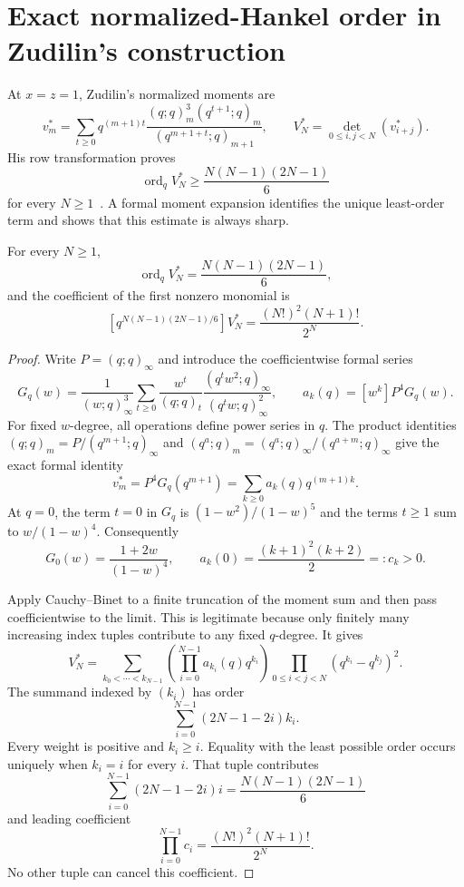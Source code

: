 \documentclass[11pt]{article}
\begin{document}
\section{Exact normalized-Hankel order in Zudilin's construction}
\label{sec:hankel-order}

At $x=z=1$, Zudilin's normalized moments are
\[
 v_m^*=\sum_{t\ge0}q^{(m+1)t}
 \frac{(q;q)_m^3(q^{t+1};q)_m}{(q^{m+1+t};q)_{m+1}},
 \qquad
 V_N^*=\det_{0\le i,j<N}(v_{i+j}^*).
\]
His row transformation proves
\[
 \operatorname{ord}_q V_N^*\ge
 \frac{N(N-1)(2N-1)}6
\]
for every $N\ge1$~\cite[Section~4]{zudilin2016}.  A formal moment expansion identifies the unique least-order term and
shows that this estimate is always sharp.

\begin{theorem}
\label{res:zudilin-sharp-qorder}
For every $N\ge1$,
\[
 \operatorname{ord}_q V_N^*=\frac{N(N-1)(2N-1)}6,
\]
and the coefficient of the first nonzero monomial is
\[
 [q^{N(N-1)(2N-1)/6}]V_N^*
   =\frac{(N!)^2(N+1)!}{2^N}.
\]
\end{theorem}

\begin{proof}
Write $P=(q;q)_\infty$ and introduce the coefficientwise formal series
\[
 G_q(w)=\frac1{(w;q)_\infty^3}
 \sum_{t\ge0}\frac{w^t}{(q;q)_t}
       \frac{(q^tw^2;q)_\infty}{(q^tw;q)_\infty^2},
 \qquad a_k(q)=[w^k]P^4G_q(w).
\]
For fixed $w$-degree, all operations define power series in $q$.
The product identities
$(q;q)_m=P/(q^{m+1};q)_\infty$ and
$(q^a;q)_m=(q^a;q)_\infty/(q^{a+m};q)_\infty$
give the exact formal identity
\[
 v_m^*=P^4G_q(q^{m+1})
      =\sum_{k\ge0}a_k(q)q^{(m+1)k}.
\]
At $q=0$, the term $t=0$ in $G_q$ is
$(1-w^2)/(1-w)^5$ and the terms $t\ge1$ sum to $w/(1-w)^4$.
Consequently
\[
 G_0(w)=\frac{1+2w}{(1-w)^4},\qquad
 a_k(0)=\frac{(k+1)^2(k+2)}2=:c_k>0.
\]

Apply Cauchy--Binet to a finite truncation of the moment sum and then pass
coefficientwise to the limit.  This is legitimate because only finitely many
increasing index tuples contribute to any fixed $q$-degree.  It gives
\[
 V_N^*=\sum_{k_0<\cdots<k_{N-1}}
 \left(\prod_{i=0}^{N-1}a_{k_i}(q)q^{k_i}\right)
 \prod_{0\le i<j<N}(q^{k_i}-q^{k_j})^2.
\]
The summand indexed by $(k_i)$ has order
\[
 \sum_{i=0}^{N-1}(2N-1-2i)k_i.
\]
Every weight is positive and $k_i\ge i$.  Equality with the least possible
order occurs uniquely when $k_i=i$ for every $i$.  That tuple contributes
\[
 \sum_{i=0}^{N-1}(2N-1-2i)i=\frac{N(N-1)(2N-1)}6
\]
and leading coefficient
\[
 \prod_{i=0}^{N-1}c_i=\frac{(N!)^2(N+1)!}{2^N}.
\]
No other tuple can cancel this coefficient.
\end{proof}
\end{document}
